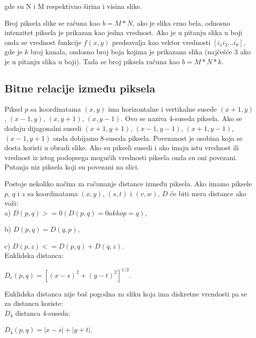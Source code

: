 \documentclass[a4paper,12pt,titlepage]{article}
\begin{document}
gde su N i M respektivno širina i visina slike.

Broj piksela slike se računa kao $b = M * N$, ako je slika crno bela, odnosno intenzitet piksela je prikazan kao jedna vrednost. Ako je u pitanju slika u boji onda se vrednost funkcije $f(x, y)$ predsavalja kao vektor vrednosti $[i_{1} i_{2} \dots i_{k}]$, gde je $k$ broj kanala, ondosno broj boja kojima je prikazana slika (najčešće 3 ako je u pitanju slika u boji). Tada se broj piksela računa kao $b = M * N * k$.

\subsection{Bitne relacije između piksela}%

Piksel $p$ sa koordinatama $(x, y)$ ima horizontalne i vertikalne susede $(x + 1, y)$, $(x - 1, y)$, $(x, y + 1)$, $(x, y - 1)$. Ovo se naziva 4-suseda piksela. Ako se dodaju dijagonalni susedi $(x + 1, y + 1)$, $(x - 1, y - 1)$, $(x + 1, y - 1)$, $(x - 1, y + 1)$ onda dobijamo 8-suseda piksela. Povezanost je osobina koja se dosta koristi u obradi slike. Ako su pikseli susedi i ako imaju istu vrednost ili vrednost iz istog podopsega mogućih vrednosti piksela onda su oni povezani. Putanja niz piksela koji su povezani na slici.

Postoje nekoliko načina za računanje distance između piksela. Ako imamo piksele $p$, $q$ i $z$ sa koordinatama $(x, y)$, $(s, t)$ i $(v, w)$, $D$ će biti mera distance ako važi: \\

a) $D(p, q) >= 0 (D(p, q) = 0 akko p = q)$,

b) $D(p, q) = D(q, p)$,

c) $D(p, z) <= D(p, q) + D(q, z)$.\\

Euklidska distanca: 

\begin{center}
$D_{e}(p, q) = [ (x  - s)^{2} + (y - t)^{2} ]^{1/2}.$
\end{center} 

Euklidska distanca nije baš pogodna za sliku koja ima diskretne vrendosti pa se za distancu koriste:\\

$D_{4}$ distanca 4-suseda:

\begin{center}
$D_{4}(p, q) = |x - s| + |y + t|.$
\end{center} 
\end{document}
